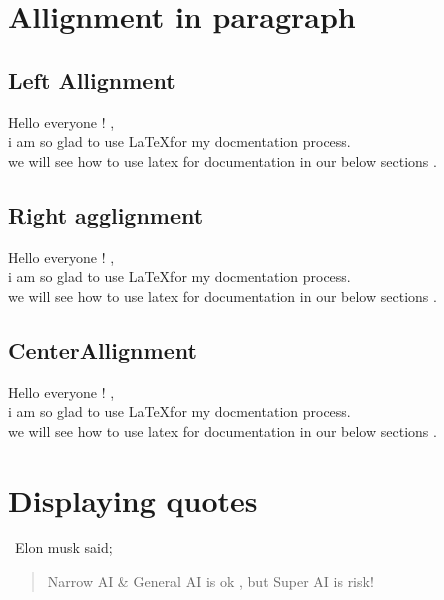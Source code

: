 \documentclass[a4paper,12pt]{article}
\begin{document}
	\section{Allignment in paragraph}
	
	\subsection{Left Allignment }
	\begin{flushleft}
		\small
		Hello everyone ! , \\
		i am so glad to use \LaTeX for my docmentation process.\\
		we will see how to use latex for documentation in our below sections .
	\end{flushleft}
	\subsection{Right agglignment}
	\begin{flushright}
		\large
		Hello everyone ! , \\
		i am so glad to use \LaTeX for my docmentation process.\\
		we will see how to use latex for documentation in our below sections .
		
	\end{flushright}
	
	\pagebreak
	\subsection{ CenterAllignment }
	\begin{center}
		\LARGE
		Hello everyone ! , \\
		i am so glad to use \LaTeX for my docmentation process.\\
		we will see how to use latex for documentation in our below sections .
		
	\end{center}
	\section{Displaying quotes}
	\large
	\ Elon musk said;
	\begin{quote}
		Narrow AI \& General AI is ok , but Super AI is risk!
	\end{quote}
	
\end{document}
